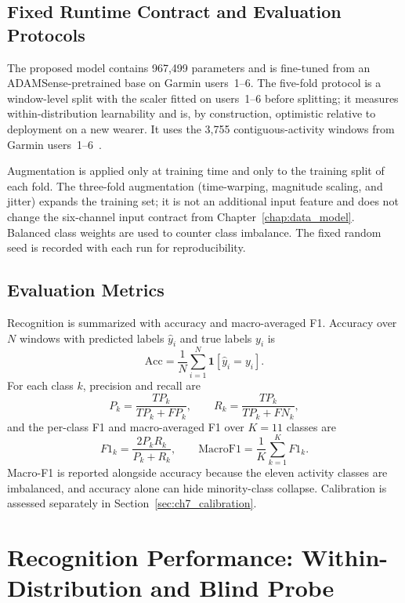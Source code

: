 \subsection{Fixed Runtime Contract and Evaluation Protocols}
\label{sec:ch7_protocols_setup}

The proposed model contains 967{,}499 parameters and is fine-tuned from an ADAMSense-pretrained base on Garmin users~1--6. The five-fold protocol is a window-level split with the scaler fitted on users~1--6 before splitting; it measures within-distribution learnability and is, by construction, optimistic relative to deployment on a new wearer. It uses the 3{,}755 contiguous-activity windows from Garmin users~1--6~\cite{hammerla2016deep,bulling2014tutorial,reiss2012pamap}.

Augmentation is applied only at training time and only to the training split of each fold. The three-fold augmentation (time-warping, magnitude scaling, and jitter) expands the training set; it is not an additional input feature and does not change the six-channel input contract from Chapter~\ref{chap:data_model}. Balanced class weights are used to counter class imbalance. The fixed random seed is recorded with each run for reproducibility.

\subsection{Evaluation Metrics}
\label{sec:ch7_metrics}

Recognition is summarized with accuracy and macro-averaged F1. Accuracy over \(N\) windows with predicted labels \(\hat{y}_i\) and true labels \(y_i\) is
\[
\mathrm{Acc}=\frac{1}{N}\sum_{i=1}^{N}\mathbf{1}\!\left[\hat{y}_i=y_i\right].
\]
For each class \(k\), precision and recall are
\[
P_k=\frac{TP_k}{TP_k+FP_k},
\qquad
R_k=\frac{TP_k}{TP_k+FN_k},
\]
and the per-class F1 and macro-averaged F1 over \(K=11\) classes are
\[
F1_k=\frac{2P_kR_k}{P_k+R_k},
\qquad
\mathrm{MacroF1}=\frac{1}{K}\sum_{k=1}^{K}F1_k.
\]
Macro-F1 is reported alongside accuracy because the eleven activity classes are imbalanced, and accuracy alone can hide minority-class collapse. Calibration is assessed separately in Section~\ref{sec:ch7_calibration}.

\section{Recognition Performance: Within-Distribution and Blind Probe}
\label{sec:ch7_recognition}

